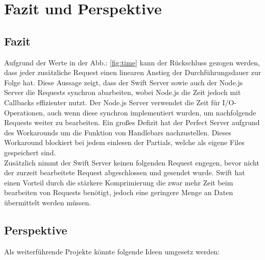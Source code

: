 \chapter{Fazit und Perspektive}\label{chap:conclusion}
\chapterstart

\section{Fazit}

Aufgrund der Werte in der Abb.: \ref{fig:time} kann der Rückschluss gezogen werden, dass jeder zusätzliche Request einen linearen Anstieg der Durchführungsdauer zur Folge hat. Diese Aussage zeigt, dass der Swift Server sowie auch der Node.js Server die Requests synchron abarbeiten, wobei Node.js die Zeit jedoch mit Callbacks effizienter nutzt. Der Node.js Server verwendet die Zeit für I/O-Operationen, auch wenn diese synchron implementiert wurden, um nachfolgende Requests weiter zu bearbeiten. Ein großes Defizit hat der Perfect Server aufgrund des Workarounds um die Funktion von Handlebars nachzustellen. Dieses Workaround blockiert bei jedem einlesen der Partials, welche als eigene Files gespeichert sind.\\
Zusätzlich nimmt der Swift Server keinen folgenden Request engegen, bevor nicht der zurzeit bearbeitete Request abgeschlossen und gesendet wurde. Swift hat einen Vorteil durch die stärkere Komprimierung die zwar mehr Zeit beim bearbeiten von Requests benötigt, jedoch eine geringere Menge an Daten übermittelt werden müssen.

\section{Perspektive}

Als weiterführende Projekte könnte folgende Ideen umgesetz werden:

